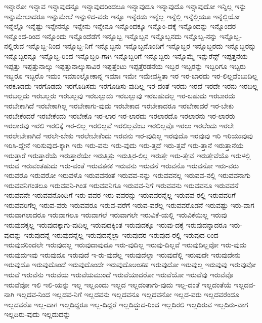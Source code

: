 {ಇನ್ನಾರೋ
ಇನ್ನಾವ
ಇನ್ನಾವುದನ್ನೂ
ಇನ್ನಾವುದರಿಂದಲೂ
ಇನ್ನಾವುದೂ
ಇನ್ನಾವುದೊ
ಇನ್ನಾವುದೋ
ಇನ್ನಿಲ್ಲ
ಇನ್ನು
ಇನ್ನುಮೇಲಾದರೂ
ಇನ್ನುಮೇಲೆ
ಇನ್ನುಳಿದ-ವರು
ಇನ್ನೂ
ಇನ್ನೆರಡು
ಇನ್ನೆಲ್ಲ
ಇನ್ನೆಲ್ಲಿ
ಇನ್ನೆಲ್ಲಿಯೂ
ಇನ್ನೆಲ್ಲಿಯೋ
ಇನ್ನೆಲ್ಲೊ
ಇನ್ನೆಷ್ಟು
ಇನ್ನೇನನ್ನೂ
ಇನ್ನೇನು
ಇನ್ನೇನೂ
ಇನ್ನೊಂದಕ್ಕೂ
ಇನ್ನೊಂ-ದಕ್ಕೆ
ಇನ್ನೊಂದನ್ನು
ಇನ್ನೊಂದರ
ಇನ್ನೊಂದ-ರಿಂದ
ಇನ್ನೊಂದು
ಇನ್ನೊಂದೆಡೆಗೆ
ಇನ್ನೊಬ್ಬ
ಇನ್ನೊಬ್ಬನ
ಇನ್ನೊಬ್ಬನದು
ಇನ್ನೊಬ್ಬ-ನನ್ನು
ಇನ್ನೊಬ್ಬ-ನಲ್ಲಿರುವ
ಇನ್ನೊಬ್ಬ-ನಿಂದ
ಇನ್ನೊಬ್ಬ-ನಿಗೆ
ಇನ್ನೊಬ್ಬನು
ಇನ್ನೊಬ್ಬನೊಂದಿಗೆ
ಇನ್ನೊಬ್ಬರ
ಇನ್ನೊಬ್ಬರದು
ಇನ್ನೊಬ್ಬರನ್ನು
ಇನ್ನೊಬ್ಬರನ್ನೂ
ಇನ್ನೊಬ್ಬ-ರಿಂದ
ಇನ್ನೊಬ್ಬರಿ-ಗಾಗಿ
ಇನ್ನೊಬ್ಬರಿಗೆ
ಇನ್ನೊಬ್ಬರು
ಇನ್ನೊಮ್ಮೆ
ಇನ್ಷುರೆನ್ಸ್
ಇಪ್ಪತ್ತನೆಯ
ಇಪ್ಪತ್ತು
ಇಪ್ಪತ್ತುನಾಲ್ಕು
ಇಪ್ಪತ್ತುನಾಲ್ಕುಸಾವಿರ
ಇಪ್ಪತ್ತೆಂಟು
ಇಪ್ಪತ್ತೆರಡನೆಯ
ಇಬ್ಬರ
ಇಬ್ಬರನ್ನು
ಇಬ್ಬರಿಗೂ
ಇಬ್ಬರು
ಇಬ್ಬರೂ
ಇಬ್ಬರೊ
ಇಮಂ
ಇಮಾಂಲ್ಲೋಕಾನ್ನ
ಇಮಾಃ
ಇಮೇ
ಇಮೇವಸ್ಥಿತಾ
ಇರ
ಇರ-ಬಾರದು
ಇರ-ಲಿಲ್ಲವೆಂಬುದಿಲ್ಲ
ಇರಕೂಡದು
ಇರಗೊಡದು
ಇರಗೊಡಿಸದು
ಇರಗೊಡಿಸು-ವುದಿಲ್ಲ
ಇರ-ದಂತೆ
ಇರದು
ಇರದೆ
ಇರದೇ
ಇರನು
ಇರಬಲ್ಲ
ಇರಬಲ್ಲದು
ಇರಬಲ್ಲರು
ಇರಬಲ್ಲವು
ಇರಬಲ್ಲುದು
ಇರಬಲ್ಲುವು
ಇರಬಹುದಲ್ಲ
ಇರ-ಬಹುದು
ಇರಬಾರದು
ಇರಬೇಕಾಗಿದೆ
ಇರಬೇಕಾಗಿಲ್ಲ
ಇರಬೇಕಾಗು-ವುದು
ಇರಬೇಕಾದ
ಇರಬೇಕಾದರೂ
ಇರಬೇಕಾದರೆ
ಇರ-ಬೇಕು
ಇರಬೇಕೆಂದರೆ
ಇರಬೇಕೆಂದು
ಇರಬೇಕೊ
ಇರ-ಲಾರ
ಇರ-ಲಾರದು
ಇರಲಾರದೊ
ಇರಲಾರನು
ಇರ-ಲಾರರು
ಇರಲಾರವು
ಇರಲಿ
ಇರಲಿಕ್ಕೆ
ಇರ-ಲಿಲ್ಲ
ಇರಲಿಲ್ಲವೆ
ಇರಲಿಲ್ಲವೆಂಬ
ಇರಲಿಲ್ಲವೊ
ಇರಲು
ಇರಲೆಂದು
ಇರಲೇ
ಇರಲೇಬೇಕಾಗಿದೆ
ಇರಲೇ-ಬೇಕು
ಇರಲೇಬೇಕೆಂದು
ಇರವನು
ಇರ-ವುದಿಲ್ಲ
ಇರವುದೊ
ಇರವುವು
ಇರಿ
ಇರಿಯುವುವು
ಇರಿಸಿ-ದ್ದೇನೆ
ಇರಿಸುವುದ-ಕ್ಕಾಗಿ
ಇರು
ಇರು-ವನು
ಇರು-ವುದು
ಇರು-ತ್ತದೆ
ಇರು-ತ್ತವೆ
ಇರು-ತ್ತಾನೆ
ಇರುತ್ತಾನೆಯೆ
ಇರುತ್ತಾರೆ
ಇರುತ್ತಾರೆಯೆ
ಇರುತ್ತಾರೆಯೇ
ಇರುತ್ತಿತ್ತು
ಇರುತ್ತಿರ-ಲಿಲ್ಲ
ಇರುತ್ತೇ
ಇರು-ತ್ತೇವೆ
ಇರುತ್ತೇವೆಯೊ
ಇರುಳಲ್ಲಿ
ಇರುವ
ಇರುವಂತಹುದು
ಇರು-ವಂತೆ
ಇರುವತನಕ
ಇರುವನು
ಇರುವನೆ
ಇರುವನೊ
ಇರುವನೋ
ಇರು-ವರು
ಇರುವರೊ
ಇರುವರೋ
ಇರುವಳೊ
ಇರುವವನಂತೆ
ಇರುವವ-ನನ್ನು
ಇರುವವನಲ್ಲ
ಇರುವವ-ನಲ್ಲಿ
ಇರುವವನಾಗು
ಇರುವವನಿಗಂತಲೂ
ಇರುವವನಿ-ಗಿಂತ
ಇರುವವನಿಗೂ
ಇರುವವ-ನಿಗೆ
ಇರುವವನು
ಇರುವವನೂ
ಇರುವವನೆ
ಇರುವವನೇ
ಇರುವವನೊಂದಿಗೆ
ಇರು-ವವರ
ಇರು-ವವರನ್ನು
ಇರುವವರನ್ನೆಲ್ಲ
ಇರುವವ-ರಲ್ಲಿ
ಇರುವವರಿಗೆ
ಇರುವವರಿಗೆಲ್ಲ
ಇರುವ-ವರು
ಇರುವವರೂ
ಇರುವ-ವರೆಗೆ
ಇರುವ-ವರೆಲ್ಲ
ಇರುವವರೊಡನೆ
ಇರುವಷ್ಟು
ಇರು-ವಾಗ
ಇರುವಾಗಲಾದರೂ
ಇರುವಾಗಲೂ
ಇರುವಾಗಲೆ
ಇರುವಾಗಲೇ
ಇರುವಿಕೆ-ಯಲ್ಲಿ
ಇರುವಿಕೆಯಿಲ್ಲ
ಇರುವು
ಇರುವುದಕ್ಕಲ್ಲ
ಇರುವುದಕ್ಕಾಗು-ವುದಿಲ್ಲ
ಇರುವುದಕ್ಕಿಂತ
ಇರುವುದಕ್ಕೂ
ಇರುವು-ದಕ್ಕೆ
ಇರುವುದನ್ನಾದರೂ
ಇರು-ವುದನ್ನು
ಇರುವುದನ್ನೆ
ಇರುವುದನ್ನೆಲ್ಲ
ಇರುವುದನ್ನೆಲ್ಲಾ
ಇರುವುದರ
ಇರುವುದ-ರಲ್ಲಿ
ಇರುವುದ-ರಿಂದ
ಇರುವುದರಿಂದಲೇ
ಇರುವುದಲ್ಲ
ಇರುವುದಾವುದೂ
ಇರು-ವುದಿಲ್ಲ
ಇರುವು-ದಿಲ್ಲವೆ
ಇರುವುದಿಲ್ಲವೋ
ಇರು-ವುದು
ಇರುವುದುಇವು
ಇರುವುದೂ
ಇರುವುದೆ
ಇ-ರು-ವುದೆಲ್ಲ
ಇರುವುದೆಲ್ಲಾ
ಇರುವುದೆಲ್ಲಿ
ಇರುವುದೇ
ಇರುವುದೇನು
ಇರುವುದೊ
ಇರುವುದೊಂದೆ
ಇರುವುದೊಂದೇ
ಇರುವುದೊಅಂತಹ
ಇರುವುದೋ
ಇರುವುಲ್ಲ
ಇರುವುವು
ಇರುವುವೋ
ಇರುವೆ
ಇರುವೆನು
ಇರುವೆಯ
ಇರುವೆಯಮುಂದೆ
ಇರುವೆಯಾದರೋ
ಇರುವೆಯೋ
ಇರುವೆವು
ಇರುವೆವೊ
ಇರುವೆವೋ
ಇಲಿ
ಇಲಿ-ಯನ್ನು
ಇಲ್ಲ
ಇಲ್ಲಎಂದು
ಇಲ್ಲದ
ಇಲ್ಲದಂತಾಗು-ವುದು
ಇಲ್ಲ-ದಂತೆ
ಇಲ್ಲದಂತೆಯೆ
ಇಲ್ಲದವ-ನಾಗಿ
ಇಲ್ಲದವ-ನಿಂದ
ಇಲ್ಲದವ-ನಿಗೆ
ಇಲ್ಲದವನು
ಇಲ್ಲದವನೂ
ಇಲ್ಲದವನೋ
ಇಲ್ಲದ-ವರು
ಇಲ್ಲದವರೆಂದೂ
ಇಲ್ಲದವರೊ
ಇಲ್ಲ-ದಾಗ
ಇಲ್ಲದಿದ್ದರೂ
ಇಲ್ಲ-ದಿದ್ದರೆ
ಇಲ್ಲದಿದ್ದುದ-ರಿಂದ
ಇಲ್ಲದಿರಲಿ
ಇಲ್ಲದಿರುವ
ಇಲ್ಲದಿರು-ವಾಗ
ಇಲ್ಲದಿರು-ವುದು
ಇಲ್ಲದುದನ್ನು
}
